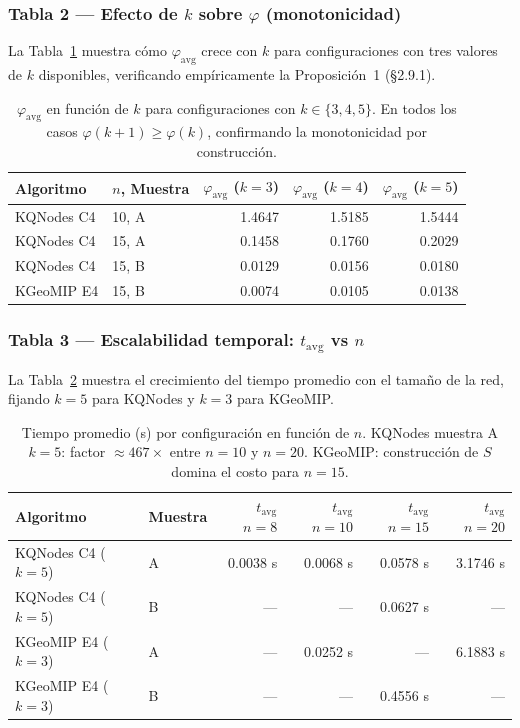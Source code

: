 \subsubsection*{Tabla 2 — Efecto de $k$ sobre $\varphi$ (monotonicidad)}

La Tabla~\ref{tab:monotonicidad} muestra cómo $\varphi_{\mathrm{avg}}$
crece con $k$ para configuraciones con tres valores de $k$ disponibles,
verificando empíricamente la Proposición~1 (§2.9.1).

\begin{table}[H]
\centering
\begin{tabular}{llrrr}
  \toprule
  \textbf{Algoritmo} & $n$, Muestra &
  $\varphi_{\mathrm{avg}}$ ($k=3$) &
  $\varphi_{\mathrm{avg}}$ ($k=4$) &
  $\varphi_{\mathrm{avg}}$ ($k=5$) \\
  \midrule
  KQNodes C4 & 10, A & 1.4647 & 1.5185 & 1.5444 \\
  KQNodes C4 & 15, A & 0.1458 & 0.1760 & 0.2029 \\
  KQNodes C4 & 15, B & 0.0129 & 0.0156 & 0.0180 \\
  KGeoMIP E4 & 15, B & 0.0074 & 0.0105 & 0.0138 \\
  \bottomrule
\end{tabular}
\caption{$\varphi_{\mathrm{avg}}$ en función de $k$ para configuraciones con
  $k \in \{3,4,5\}$. En todos los casos $\varphi(k{+}1) \geq \varphi(k)$,
  confirmando la monotonicidad por construcción.}
\label{tab:monotonicidad}
\end{table}

\subsubsection*{Tabla 3 — Escalabilidad temporal: $t_{\mathrm{avg}}$ vs $n$}

La Tabla~\ref{tab:escalabilidad} muestra el crecimiento del tiempo promedio
con el tamaño de la red, fijando $k=5$ para KQNodes y $k=3$ para KGeoMIP.

\begin{table}[H]
\centering
\begin{tabular}{llrrrr}
  \toprule
  \textbf{Algoritmo} & Muestra &
  $t_{\mathrm{avg}}$ $n=8$ &
  $t_{\mathrm{avg}}$ $n=10$ &
  $t_{\mathrm{avg}}$ $n=15$ &
  $t_{\mathrm{avg}}$ $n=20$ \\
  \midrule
  KQNodes C4 ($k=5$) & A & 0.0038 s & 0.0068 s & 0.0578 s & 3.1746 s \\
  KQNodes C4 ($k=5$) & B & --- & --- & 0.0627 s & --- \\
  KGeoMIP E4 ($k=3$) & A & --- & 0.0252 s & --- & 6.1883 s \\
  KGeoMIP E4 ($k=3$) & B & --- & --- & 0.4556 s & --- \\
  \bottomrule
\end{tabular}
\caption{Tiempo promedio (s) por configuración en función de $n$.
  KQNodes muestra A $k=5$: factor $\approx 467\times$ entre $n=10$ y $n=20$.
  KGeoMIP: construcción de $S$ domina el costo para $n=15$.}
\label{tab:escalabilidad}
\end{table}

